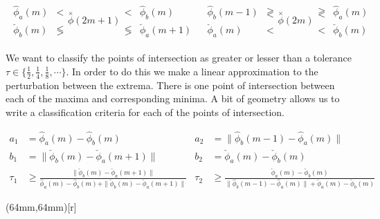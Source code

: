 \begin{align}
\begin{array}{cc}
      \hat{\phi}_{a}(m)  & <            \\
 \check{\phi}_{b}(m)  & \lessgtr   
\end{array}
\overset{\times}{\phi} (2m+1) 
\begin{array}{cc}
 <             &    \hat{\phi}_{b}(m)  \\
\lessgtr    &\check{\phi}_{a} (m+1)  
\end{array} 
& 
\begin{array}{cc}
 \hat{\phi}_{b}(m-1) &\gtrless \\
  \check{\phi}_{a} (m) & < 
\end{array}
\overset{\times}{\phi} (2m) 
\begin{array}{cc}
\gtrless &     \hat{\phi}_{a}(m)  \\
  < & \check{\phi}_{b}(m)  
\end{array} 
\end{align}

We want to classify the points of intersection as greater or lesser than a tolerance $\tau \in \{ \frac{1}{2}, \frac{1}{4},\frac{1}{8}, \cdots \}$. In order to do this we make a linear approximation to the perturbation between the extrema. There is one point of intersection between each of the maxima and corresponding minima. A bit of geometry allows us to write a classification criteria for each of the points of intersection.

\begin{align*}
a_1 & =     \hat{\phi}_{a}(m)     -      \hat{\phi}_{b}(m)  &
a_2 &=     \| \hat{\phi}_{b}(m-1) -     \hat{\phi}_{a}(m) \|  \\
b_1 &= \| \check{\phi}_{b}(m)     - \check{\phi}_{a} (m+1) \| &
b_2 &= \check{\phi}_{a}(m)     - \check{\phi}_{b}(m) \\
\tau_1 &\ge \frac{\| \check{\phi}_{b}(m)  - \check{\phi}_{a} (m+1) \| }{ \hat{\phi}_{a}(m)  - \hat{\phi}_{b}(m)+\| \check{\phi}_{b}(m)  - \check{\phi}_{a} (m+1) \| } & 
\tau_2 &\ge \frac{\check{\phi}_{a}(m)  - \check{\phi}_{b}(m) }{\| \hat{\phi}_{b}(m-1) - \hat{\phi}_{a}(m) \| +\check{\phi}_{a}(m)  - \check{\phi}_{b}(m) }
\end{align*}

\parpic(64mm,64mm)[r]{
}

